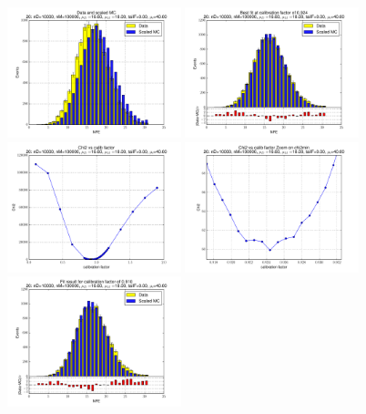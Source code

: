 
 \begin{figure}[htbp] \begin{center} 
\includegraphics[width=0.45\textwidth]{../FIGURES/20/FIG_Data_and_scaled_MC.pdf} 
\includegraphics[width=0.45\textwidth]{../FIGURES/20/FIG_Best_fit_at_calibration_factor_of_0_924.pdf} 
\includegraphics[width=0.45\textwidth]{../FIGURES/20/FIG_Chi2_vs_calib_factor.pdf} 
\includegraphics[width=0.45\textwidth]{../FIGURES/20/FIG_Chi2_vs_calib_factor_Zoom_on_chi2min.pdf} 
\includegraphics[width=0.45\textwidth]{../FIGURES/20/FIG_Fit_result_for_calibration_factor_of_0_910.pdf} 

\end{center}
\end{figure}

